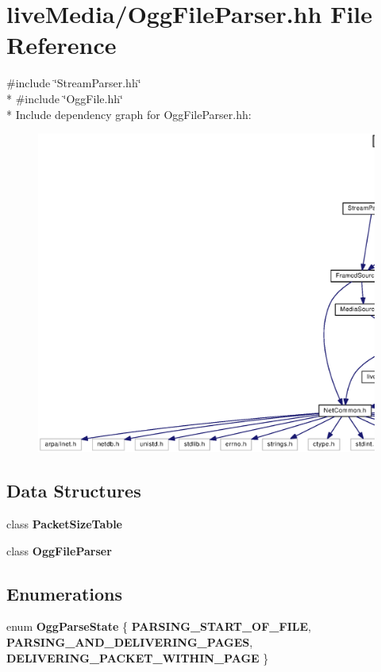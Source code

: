 \section{live\+Media/\+Ogg\+File\+Parser.hh File Reference}
\label{OggFileParser_8hh}
{\ttfamily \#include \char`\"{}Stream\+Parser.\+hh\char`\"{}}\\*
{\ttfamily \#include \char`\"{}Ogg\+File.\+hh\char`\"{}}\\*
Include dependency graph for Ogg\+File\+Parser.\+hh\+:
\nopagebreak
\begin{figure}[H]
\begin{center}
\leavevmode
\includegraphics[width=350pt]{OggFileParser_8hh__incl}
\end{center}
\end{figure}
\subsection*{Data Structures}
\begin{DoxyCompactItemize}
\item 
class {\bf Packet\+Size\+Table}
\item 
class {\bf Ogg\+File\+Parser}
\end{DoxyCompactItemize}
\subsection*{Enumerations}
\begin{DoxyCompactItemize}
\item 
enum {\bf Ogg\+Parse\+State} \{ {\bf P\+A\+R\+S\+I\+N\+G\+\_\+\+S\+T\+A\+R\+T\+\_\+\+O\+F\+\_\+\+F\+I\+L\+E}, 
{\bf P\+A\+R\+S\+I\+N\+G\+\_\+\+A\+N\+D\+\_\+\+D\+E\+L\+I\+V\+E\+R\+I\+N\+G\+\_\+\+P\+A\+G\+E\+S}, 
{\bf D\+E\+L\+I\+V\+E\+R\+I\+N\+G\+\_\+\+P\+A\+C\+K\+E\+T\+\_\+\+W\+I\+T\+H\+I\+N\+\_\+\+P\+A\+G\+E}
 \}
\end{DoxyCompactItemize}


